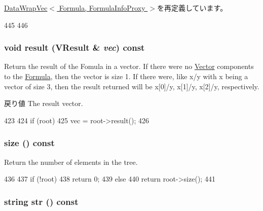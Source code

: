 \hyperlink{classStats_1_1DataWrapVec_ad20897c5c8bd47f5d4005989bead0e55}{DataWrapVec$<$ Formula, FormulaInfoProxy $>$}を再定義しています。


\begin{DoxyCode}
445 {
446 }
\end{DoxyCode}
\hypertarget{classStats_1_1Formula_a9dff2394cecff3afb2bf8662c9c9bc04}{
\subsubsection[{result}]{\setlength{\rightskip}{0pt plus 5cm}void result ({\bf VResult} \& {\em vec}) const}}
\label{classStats_1_1Formula_a9dff2394cecff3afb2bf8662c9c9bc04}
Return the result of the Fomula in a vector. If there were no \hyperlink{classStats_1_1Vector}{Vector} components to the \hyperlink{classStats_1_1Formula}{Formula}, then the vector is size 1. If there were, like x/y with x being a vector of size 3, then the result returned will be x\mbox{[}0\mbox{]}/y, x\mbox{[}1\mbox{]}/y, x\mbox{[}2\mbox{]}/y, respectively. \begin{DoxyReturn}{戻り値}
The result vector. 
\end{DoxyReturn}



\begin{DoxyCode}
423 {
424     if (root)
425         vec = root->result();
426 }
\end{DoxyCode}
\hypertarget{classStats_1_1Formula_a503ab01f6c0142145d3434f6924714e7}{
\subsubsection[{size}]{ size () const}}
\label{classStats_1_1Formula_a503ab01f6c0142145d3434f6924714e7}
Return the number of elements in the tree. 


\begin{DoxyCode}
436 {
437     if (!root)
438         return 0;
439     else
440         return root->size();
441 }
\end{DoxyCode}
\hypertarget{classStats_1_1Formula_a0bd251dfecae718a4c1568eb3d660697}{
\subsubsection[{str}]{\setlength{\rightskip}{0pt plus 5cm}string str () const}}
\label{classStats_1_1Formula_a0bd251dfecae718a4c1568eb3d660697}



